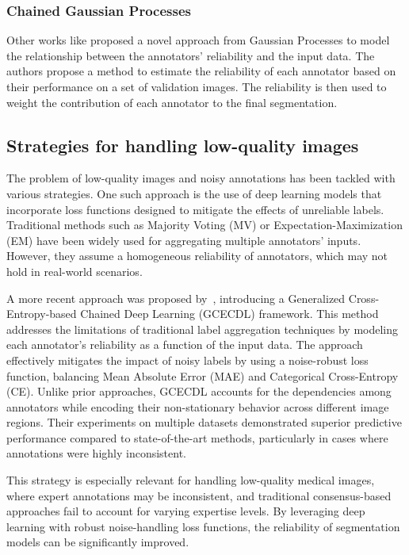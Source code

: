\subsubsection{Chained Gaussian Processes}

Other works like \cite{GilGonzalesEtAl2025} proposed a novel approach from
Gaussian Processes to model the relationship between the annotators'
reliability and the input data. The authors propose a method to
estimate the reliability of each annotator based on their performance
on a set of validation images. The reliability is then used to weight
the contribution of each annotator to the final segmentation.

\subsection{Strategies for handling low-quality images}

The problem of low-quality images and noisy annotations has been
tackled with various strategies. One such approach is the use of deep
learning models that incorporate loss functions designed to mitigate
the effects of unreliable labels. Traditional methods such as
Majority Voting (MV) or Expectation-Maximization (EM) have been
widely used for aggregating multiple annotators' inputs. However,
they assume a homogeneous reliability of annotators, which may not
hold in real-world scenarios.

A more recent approach was proposed by~\cite{TrianaEtAl2023},
introducing a Generalized Cross-Entropy-based Chained Deep Learning
(GCECDL) framework. This method addresses the limitations of
traditional label aggregation techniques by modeling each annotator's
reliability as a function of the input data. The approach effectively
mitigates the impact of noisy labels by using a noise-robust loss
function, balancing Mean Absolute Error (MAE) and Categorical
Cross-Entropy (CE). Unlike prior approaches, GCECDL accounts for the
dependencies among annotators while encoding their non-stationary
behavior across different image regions. Their experiments on
multiple datasets demonstrated superior predictive performance
compared to state-of-the-art methods, particularly in cases where
annotations were highly inconsistent.

This strategy is especially relevant for handling low-quality medical
images, where expert annotations may be inconsistent, and traditional
consensus-based approaches fail to account for varying expertise
levels. By leveraging deep learning with robust noise-handling loss
functions, the reliability of segmentation models can be significantly improved.

